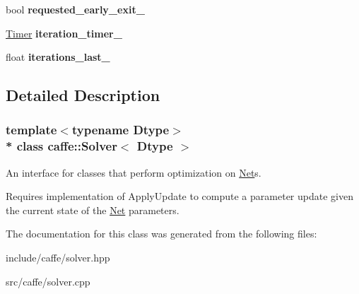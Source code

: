\begin{DoxyCompactItemize}
\item 
bool {\bfseries requested\+\_\+early\+\_\+exit\+\_\+}\hypertarget{classcaffe_1_1Solver_a5d9ea1f82685a4091290f45984cf9167}{}\label{classcaffe_1_1Solver_a5d9ea1f82685a4091290f45984cf9167}

\item 
\hyperlink{classcaffe_1_1Timer}{Timer} {\bfseries iteration\+\_\+timer\+\_\+}\hypertarget{classcaffe_1_1Solver_aed311f5862c2c36472e599bfbf8cb4dd}{}\label{classcaffe_1_1Solver_aed311f5862c2c36472e599bfbf8cb4dd}

\item 
float {\bfseries iterations\+\_\+last\+\_\+}\hypertarget{classcaffe_1_1Solver_a5d8886230702c45e94d2d427d0bb17fe}{}\label{classcaffe_1_1Solver_a5d8886230702c45e94d2d427d0bb17fe}

\end{DoxyCompactItemize}


\subsection{Detailed Description}
\subsubsection*{template$<$typename Dtype$>$\\*
class caffe\+::\+Solver$<$ Dtype $>$}

An interface for classes that perform optimization on \hyperlink{classcaffe_1_1Net}{Net}s. 

Requires implementation of Apply\+Update to compute a parameter update given the current state of the \hyperlink{classcaffe_1_1Net}{Net} parameters. 

The documentation for this class was generated from the following files\+:\begin{DoxyCompactItemize}
\item 
include/caffe/solver.\+hpp\item 
src/caffe/solver.\+cpp\end{DoxyCompactItemize}
